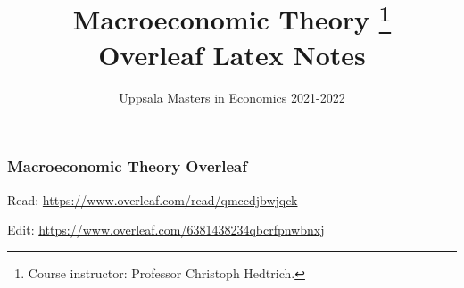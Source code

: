 \documentclass[aspectratio=169,xcolor=dvipsnames]{beamer}
\title{ Macroeconomic Theory
        \thanks{Course instructor: Professor Christoph Hedtrich.} \\
        Overleaf Latex Notes
        }
\author{
    Uppsala Masters in Economics 2021-2022
        }
\date{}
\begin{document}
\begin{frame}
    
    
    \frametitle{Macroeconomic Theory Overleaf}
    
    Read: \url{https://www.overleaf.com/read/qmccdjbwjqck}

    
    Edit: \url{https://www.overleaf.com/6381438234qbcrfpnwbnxj}
    
\end{frame}
\end{document}
